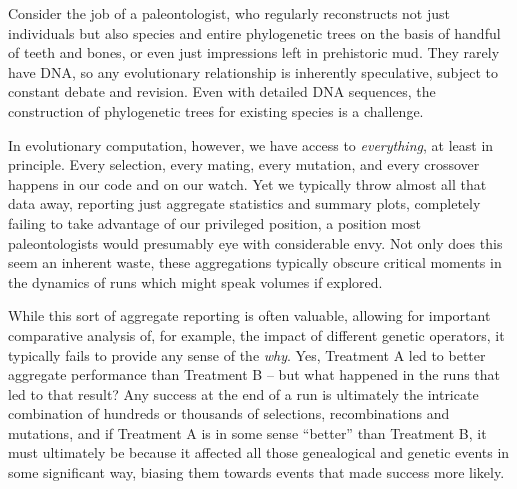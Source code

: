 Consider the job of a paleontologist, who regularly reconstructs not just individuals but also
species and entire phylogenetic trees on the basis of handful of teeth and bones, or even just
impressions left in prehistoric mud. They rarely have DNA, so any evolutionary relationship is
inherently speculative, subject to constant debate and revision. Even with detailed DNA sequences,
the construction of phylogenetic trees for existing species is a challenge.


In evolutionary computation, however, we have access to \emph{everything}, at least in principle. Every
selection, every mating, every mutation, and every crossover happens in our code and on our watch.
Yet we typically throw almost all that data away, reporting just aggregate statistics and summary
plots, completely failing to take advantage of our privileged position, a position most 
paleontologists would presumably eye with considerable envy. Not only does this seem an inherent
waste, these aggregations typically obscure critical moments in the dynamics of runs which might
speak volumes if explored.


While this sort of aggregate reporting is often valuable, allowing for important comparative
analysis of, for example, the impact of different genetic operators, it typically fails to provide
any sense of the \emph{why}. Yes, Treatment A led to better aggregate performance than 
Treatment B -- but what happened in the runs that led to that result? Any success at the end of a
run is ultimately the intricate combination of hundreds or thousands of selections, recombinations
and mutations, and if Treatment A is in some sense ``better'' than Treatment B, it must ultimately
be because it affected all those genealogical and genetic events in some significant way, biasing them
towards events that made success more likely.

